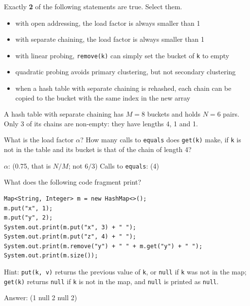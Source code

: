 \begin{question}
Exactly \textbf{2} of the following statements are true. Select them.
\begin{itemize}[leftmargin=2em,itemsep=1pt,topsep=2pt]
\item[\cb{1}] with open addressing, the load factor is always smaller than 1
\item[\cb{0}] with separate chaining, the load factor is always smaller than 1
\item[\cb{0}] with linear probing, \lstinline|remove(k)| can simply set the bucket of \lstinline|k| to empty
\item[\cb{1}] quadratic probing avoids primary clustering, but not secondary clustering
\item[\cb{0}] when a hash table with separate chaining is rehashed, each chain can be copied to the bucket with the same index in the new array
\end{itemize}
\end{question}

\begin{question}
A hash table with separate chaining has $M = 8$ buckets and holds $N = 6$ pairs. Only 3 of its chains are non-empty: they have lengths 4, 1 and 1.

What is the load factor $\alpha$? How many calls to \lstinline|equals| does \lstinline|get(k)| make, if \lstinline|k| is not in the table and its bucket is that of the chain of length 4?

$\alpha$: \underline{\hspace{1in}} \ifanswers (0.75, that is $N/M$; not $6/3$)\fi
\qquad Calls to \lstinline|equals|: \underline{\hspace{1in}} \ifanswers (4)\fi
\end{question}

\begin{question}
What does the following code fragment print?

\begin{lstlisting}
Map<String, Integer> m = new HashMap<>();
m.put("x", 1);
m.put("y", 2);
System.out.print(m.put("x", 3) + " ");
System.out.print(m.put("z", 4) + " ");
System.out.print(m.remove("y") + " " + m.get("y") + " ");
System.out.print(m.size());
\end{lstlisting}

Hint: \lstinline|put(k, v)| returns the previous value of \lstinline|k|, or \lstinline|null| if \lstinline|k| was not in the map; \lstinline|get(k)| returns \lstinline|null| if \lstinline|k| is not in the map, and \lstinline|null| is printed as \lstinline|null|.

Answer: \underline{\hspace{2in}} \ifanswers (1 null 2 null 2)\fi
\end{question}

